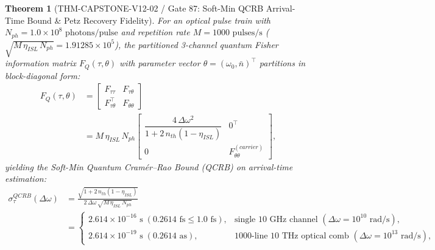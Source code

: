 \documentclass[11pt,a4paper,reqno]{article}
\def\bm#1{#1}%
\def\texttt#1{#1}%
\def\mathrm#1{#1}%
\def\mathcal#1{#1}%
\theoremstyle{plain}
\newtheorem{theorem}{Theorem}[section]
\theoremstyle{definition}
\theoremstyle{remark}
\numberwithin{equation}{section}
\begin{document}
\begin{theorem}[{\texttt{THM-CAPSTONE-V12-02} / Gate 87: Soft-Min QCRB Arrival-Time Bound \& Petz Recovery Fidelity}]
\label{thm:gate87_qcrb_petz}
For an optical pulse train with $N_{\mathrm{ph}} = 1.0 \times 10^8\text{ photons/pulse}$ and repetition rate $M = 1000\text{ pulses/s}$ ($\sqrt{M\,\eta_{\mathrm{ISL}}\,N_{\mathrm{ph}}} = 1.91285 \times 10^5$), the partitioned 3-channel quantum Fisher information matrix $\bm{\mathcal{F}}_Q(\tau, \bm{\theta})$ with parameter vector $\bm{\theta} = (\omega_0, \bar{n})^\top$ partitions in block-diagonal form:
\begin{equation}
\label{eq:qfi_partition_matrix}
\begin{split}
  \bm{\mathcal{F}}_Q(\tau, \bm{\theta}) &= 
  \begin{bmatrix}
    \mathcal{F}_{\tau\tau} & \bm{\mathcal{F}}_{\tau\bm{\theta}} \\
    \bm{\mathcal{F}}_{\tau\bm{\theta}}^\top & \bm{\mathcal{F}}_{\bm{\theta}\bm{\theta}}
  \end{bmatrix} \\
  &= M\,\eta_{\mathrm{ISL}}\,N_{\mathrm{ph}}
  \begin{bmatrix}
    \dfrac{4\,\Delta\omega^2}{1 + 2\,n_{\mathrm{th}}(1 - \eta_{\mathrm{ISL}})} & \bm{0}^\top \\[1.4ex]
    \bm{0} & \bm{\mathcal{F}}_{\bm{\theta}\bm{\theta}}^{(\mathrm{carrier})}
  \end{bmatrix},
\end{split}
\end{equation}
yielding the Soft-Min Quantum Cram\'{e}r--Rao Bound (QCRB) on arrival-time estimation:
\begin{equation}
\label{eq:softmin_qcrb_bound}
\begin{split}
  \sigma_\tau^{\mathrm{QCRB}}(\Delta\omega) &= \frac{\sqrt{1 + 2\,n_{\mathrm{th}}(1 - \eta_{\mathrm{ISL}})}}{2\,\Delta\omega\,\sqrt{M\,\eta_{\mathrm{ISL}}\,N_{\mathrm{ph}}}} \\
  &= \begin{cases}
    \bm{2.614 \times 10^{-16}\text{ s}}\;(0.2614\text{ fs} \le 1.0\text{ fs}), & \text{single } 10\text{ GHz channel } (\Delta\omega = 10^{10}\text{ rad/s}), \\[1.2ex]
    \bm{2.614 \times 10^{-19}\text{ s}}\;(0.2614\text{ as}), & 1000\text{-line } 10\text{ THz optical comb } (\Delta\omega = 10^{13}\text{ rad/s}),
  \end{cases}
\end{split}
\end{equation}

\end{theorem}
\end{document}
